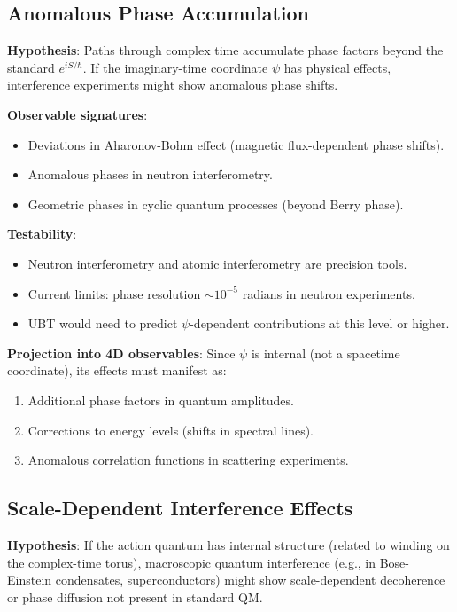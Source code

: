 \documentclass[12pt]{article}
\begin{document}
\subsection{Anomalous Phase Accumulation}

\textbf{Hypothesis}: Paths through complex time accumulate phase factors beyond the standard $e^{iS/\hbar}$. If the imaginary-time coordinate $\psi$ has physical effects, interference experiments might show anomalous phase shifts.

\textbf{Observable signatures}:
\begin{itemize}
\item Deviations in Aharonov-Bohm effect (magnetic flux-dependent phase shifts).
\item Anomalous phases in neutron interferometry.
\item Geometric phases in cyclic quantum processes (beyond Berry phase).
\end{itemize}

\textbf{Testability}:
\begin{itemize}
\item Neutron interferometry and atomic interferometry are precision tools.
\item Current limits: phase resolution $\sim 10^{-5}$ radians in neutron experiments.
\item UBT would need to predict $\psi$-dependent contributions at this level or higher.
\end{itemize}

\textbf{Projection into 4D observables}:
Since $\psi$ is internal (not a spacetime coordinate), its effects must manifest as:
\begin{enumerate}
\item Additional phase factors in quantum amplitudes.
\item Corrections to energy levels (shifts in spectral lines).
\item Anomalous correlation functions in scattering experiments.
\end{enumerate}

\subsection{Scale-Dependent Interference Effects}

\textbf{Hypothesis}: If the action quantum has internal structure (related to winding on the complex-time torus), macroscopic quantum interference (e.g., in Bose-Einstein condensates, superconductors) might show scale-dependent decoherence or phase diffusion not present in standard QM.
\end{document}
